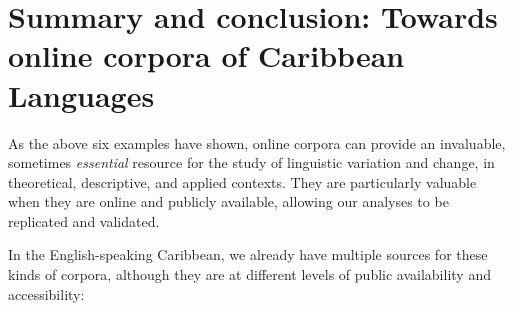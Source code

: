 \documentclass[output=paper,colorlinks,citecolor=brown]{langscibook}
\begin{document}
\section{Summary and conclusion: Towards online corpora of Caribbean Languages}

As the above six examples have shown, online corpora can provide an invaluable, sometimes \textit{essential} resource for the study of linguistic variation and change, in theoretical, descriptive, and applied contexts.  They are particularly valuable when they are online and publicly available, allowing our analyses to be replicated and validated.

In the English-speaking Caribbean, we already have multiple sources for these kinds of corpora, although they are at different levels of public availability and accessibility:
\end{document}
